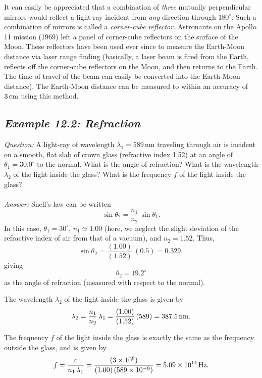 It can easily be appreciated that a combination of {\em three}\/
mutually perpendicular mirrors would reflect a light-ray incident from
{\em any}\/ direction through $180^\circ$. Such a combination of
mirrors is
called a {\em corner-cube reflector}. Astronauts on the Apollo 11
mission (1969) left  a panel  of
corner-cube reflectors on the surface of the Moon. These reflectors
have been used ever since to measure the Earth-Moon distance
via laser range finding (basically, a laser beam is fired from
the Earth, reflects off the corner-cube reflectors on the
Moon, and then returns to the Earth. The time of travel of the beam
can easily be converted into the Earth-Moon distance). The Earth-Moon
distance can be measured to within an accuracy of $3\,{\rm cm}$ using
this method. 

\subsection*{\em Example 12.2: Refraction}
{\em Question:} A light-ray of wavelength $\lambda_1 = 589$\,nm 
traveling through air is incident on a smooth, flat slab of
crown glass (refractive index 1.52) at an angle of $\theta_1=
30.0^\circ$ to the normal. What is the angle of refraction?
What is the wavelength $\lambda_2$ of the light inside the glass?
What is the frequency $f$ of the light inside the glass?\\
~\\
{\em Answer:} Snell's law can be written
$$
\sin\theta_2 = \frac{n_1}{n_2}\,\sin\theta_1.
$$
In this case, $\theta_1=30^\circ$, $n_1\simeq 1.00$ (here, we neglect the
slight deviation of the refractive index of air from that of a
vacuum), and $n_2= 1.52$. Thus,
$$
\sin\theta_2 =\frac{(1.00)}{(1.52)}\,(0.5)=0.329,
$$
giving 
$$
\theta_2 = 19.2^\circ
$$
as the angle of refraction (measured with respect to the normal). 

The wavelength $\lambda_2$ of the light inside the glass is given by
$$
\lambda_2 = \frac{n_1}{n_2}\,\lambda_1 = \frac{(1.00)}{(1.52)}\,(589)
= 387.5\,{\rm nm}.
$$

The frequency $f$ of the light inside the glass is exactly the same
as the frequency outside the glass, and is given by
$$
f = \frac{c}{n_1\,\lambda_1} = \frac{(3\times 10^8)}{(1.00)\,(589\times 10^{-9})}
=5.09\times 10^{14} \,{\rm Hz}.
$$

